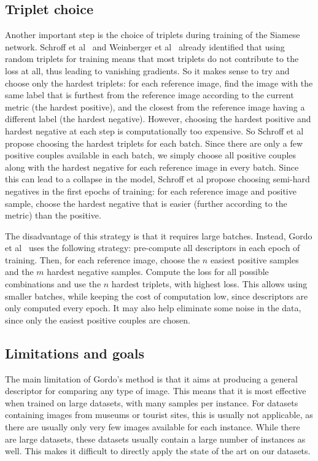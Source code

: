 \subsection{Triplet choice}
Another important step is the choice of triplets during training of
the Siamese network. Schroff et al~\cite{schroff_facenet:_2015}
and Weinberger et al~\cite{weinberger_distance_2006} already identified
that using random triplets for training means that most triplets do not
contribute to the loss at all, thus leading to vanishing gradients.
So it makes sense to try and choose only the hardest triplets: for each
reference image, find the image with the same label that is furthest from the
reference image according to the current metric (the hardest positive),
and the closest from the reference image having a different label
(the hardest negative).
However, choosing the hardest positive and hardest negative at each step
is computationally too expensive. So Schroff et al~\cite{schroff_facenet:_2015}
propose choosing the hardest triplets for each batch. Since there are only
a few positive couples available in each batch, we simply choose all
positive couples along with the hardest negative for each reference image
in every batch. Since this can lead to a collapse in the model, Schroff
et al propose choosing semi-hard negatives in the first epochs of
training: for each reference image and positive sample, choose the hardest
negative that is easier (further according to the metric) than the positive.

The disadvantage of this strategy is that it requires large batches.
Instead, Gordo et al~\cite{gordo_end--end_2016} uses the following
strategy: pre-compute all descriptors in each epoch of training.
Then, for each reference image, choose the $n$ easiest positive samples
and the $m$ hardest negative samples. Compute the loss for all possible
combinations and use the $n$ hardest triplets, with highest loss.
This allows using smaller batches, while keeping the cost of computation
low, since descriptors are only computed every epoch. It may also help
eliminate some noise in the data, since only the easiest positive couples
are chosen.

\subsection{Limitations and goals}
The main limitation of Gordo's method is that it aims at producing a
general descriptor for comparing any type of image. This means that it
is most effective when trained on large datasets, with many samples
per instance. For datasets containing images from museums or tourist
sites, this is usually not applicable, as there are usually only very few
images available for each instance. While there are large datasets,
these datasets usually contain a large number of instances as well.
This makes it difficult to directly apply the state of the art on
our datasets.

